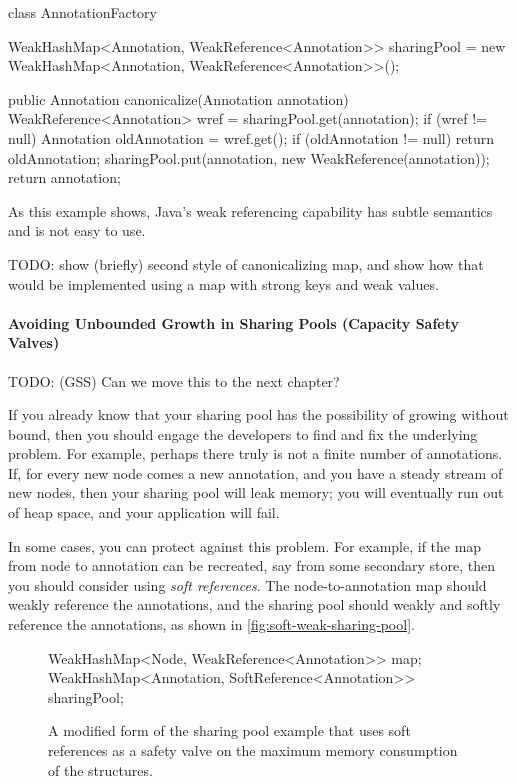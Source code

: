 \begin{figurelisting}
class AnnotationFactory {
   WeakHashMap<Annotation, WeakReference<Annotation>> sharingPool = new WeakHashMap<Annotation, WeakReference<Annotation>>();
    
    public Annotation canonicalize(Annotation annotation) {
        WeakReference<Annotation> wref = sharingPool.get(annotation);
        if (wref != null) {
            Annotation oldAnnotation = wref.get();
            if (oldAnnotation != null) return oldAnnotation;
        }
        sharingPool.put(annotation, new WeakReference(annotation));
        return annotation;
    }
}
\end{figurelisting}

As this example shows,  Java's weak referencing capability has subtle
semantics and is not easy to use.

TODO: show (briefly) second style of canonicalizing map, and show how that would
be implemented using a map with strong keys and weak values.

\paragraph{Avoiding Unbounded Growth in Sharing Pools (Capacity Safety Valves)}

TODO: (GSS) Can we move this to the next chapter? 

If you already know that your sharing pool has the possibility of growing
without bound, then you should engage the developers to find and fix the
underlying problem. For example, perhaps there truly is not a finite number of
annotations. If, for every new node comes a new annotation, and you have a
steady stream of new nodes, then your sharing pool will leak memory; you will
eventually run out of heap space, and your application will fail.

In some cases, you can protect against this problem. For example, if the map
from node to annotation can be recreated, say from some secondary store, then
you should consider using \emph{soft references}. The node-to-annotation map
should weakly reference the annotations, and the sharing pool
should weakly and softly reference the annotations, as shown in
\autoref{fig:soft-weak-sharing-pool}.

\begin{figure}[h]
\centering
\begin{framedlisting}
WeakHashMap<Node, WeakReference<Annotation>> map;
WeakHashMap<Annotation, SoftReference<Annotation>> sharingPool;
\end{framedlisting}
\caption{A modified form of the sharing pool example that uses soft references
as a safety valve on the maximum memory consumption of the structures.}
\label{fig:soft-weak-sharing-pool}
\end{figure}

